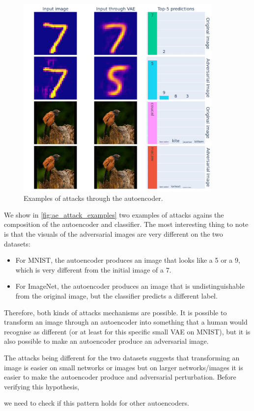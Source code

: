 \documentclass[]{scrarticle}
\renewcommand{\todo}[1]{}
\begin{document}
\begin{figure}[h]
  \centering
  \includegraphics[width=0.9\textwidth]{../images/ae_attack_examples.png}
  \caption{
    Examples of attacks through the autoencoder.
  }
  \label{fig:ae_attack_examples}
\end{figure}


We show in \autoref{fig:ae_attack_examples} two examples of attacks
agains the composition of the autoencoder and classifier.
The most interesting thing to note is that the visuals of the
adversarial images are very different on the two datasets:
\begin{itemize}
  \item For MNIST, the autoencoder produces an image that looks like
    a 5 or a 9, which is very different from the initial image of a 7.
  \item For ImageNet, the autoencoder produces an image that is undistinguishable
    from the original image, but the classifier predicts a different label.
\end{itemize}

Therefore, both kinds of attacks mechanisms are possible. It is possible to transform an image through an autoencoder
into something that a human would recognise as different
(or at least for this specific small VAE on MNIST), but it is also possible
to make an autoencoder produce an adversarial image.

The attacks being different for the two datasets suggests that
transforming an image is easier on small networks or images
but on larger networks/images it is easier to make the autoencoder
produce and adversarial perturbation.
Before verifying this hypothesis,
\todo{verify this hypothesis}
we need to check if this pattern holds for other autoencoders.
\end{document}
